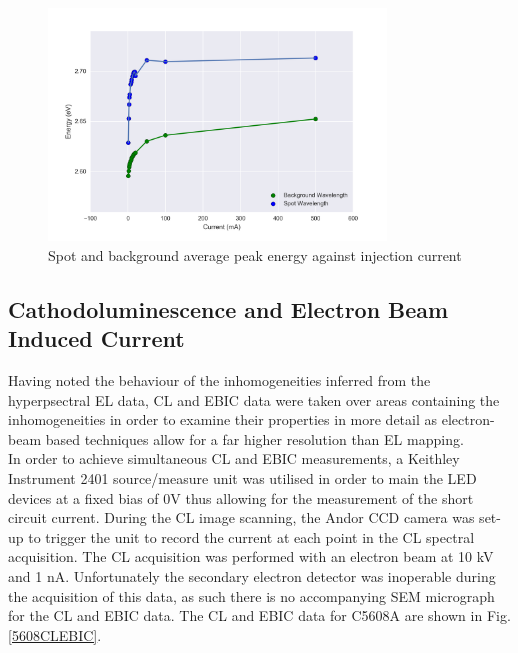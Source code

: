 \begin{figure}[!ht]
	\centering
	\includegraphics[width=0.8\textwidth]{Figs/Ch3/CentercompeV.png}
	\caption[h] {Spot and background average peak energy against injection current}
	\label{5610centrecomp}
\end{figure}

\FloatBarrier 


\subsection{Cathodoluminescence and Electron Beam Induced Current}
Having noted the behaviour of the inhomogeneities inferred from the hyperpsectral EL data, CL and EBIC data were taken over areas containing the inhomogeneities in order to examine their properties in more detail as electron-beam based techniques allow for a far higher resolution than EL mapping.\\
In order to achieve simultaneous CL and EBIC measurements, a Keithley Instrument 2401 source/measure unit was utilised in order to main the LED devices at a fixed bias of 0V thus allowing for the measurement of the short circuit current. During the CL image scanning, the Andor CCD camera was set-up to trigger the unit to record the current at each point in the CL spectral acquisition. The CL acquisition was performed with an electron beam at 10 kV and 1 nA. Unfortunately the secondary electron detector was inoperable during the acquisition of this data, as such there is no accompanying SEM micrograph for the CL and EBIC data. The CL and EBIC data for C5608A are shown in Fig.\ref{5608CLEBIC}.

